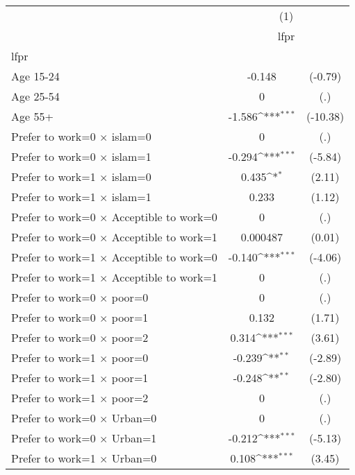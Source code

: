{
\def\sym#1{\ifmmode^{#1}\else\(^{#1}\)\fi}
\begin{longtable}{l*{1}{cc}}
\hline\hline\endfirsthead\hline\endhead\hline\endfoot\endlastfoot
                    &\multicolumn{2}{c}{(1)}           \\
                    &\multicolumn{2}{c}{lfpr}          \\
\hline
lfpr                &                     &            \\
Age 15-24           &      -0.148         &     (-0.79)\\
Age 25-54           &           0         &         (.)\\
Age 55+             &      -1.586\sym{***}&    (-10.38)\\
Prefer to work=0 $\times$ islam=0&           0         &         (.)\\
Prefer to work=0 $\times$ islam=1&      -0.294\sym{***}&     (-5.84)\\
Prefer to work=1 $\times$ islam=0&       0.435\sym{*}  &      (2.11)\\
Prefer to work=1 $\times$ islam=1&       0.233         &      (1.12)\\
Prefer to work=0 $\times$ Acceptible to work=0&           0         &         (.)\\
Prefer to work=0 $\times$ Acceptible to work=1&    0.000487         &      (0.01)\\
Prefer to work=1 $\times$ Acceptible to work=0&      -0.140\sym{***}&     (-4.06)\\
Prefer to work=1 $\times$ Acceptible to work=1&           0         &         (.)\\
Prefer to work=0 $\times$ poor=0&           0         &         (.)\\
Prefer to work=0 $\times$ poor=1&       0.132         &      (1.71)\\
Prefer to work=0 $\times$ poor=2&       0.314\sym{***}&      (3.61)\\
Prefer to work=1 $\times$ poor=0&      -0.239\sym{**} &     (-2.89)\\
Prefer to work=1 $\times$ poor=1&      -0.248\sym{**} &     (-2.80)\\
Prefer to work=1 $\times$ poor=2&           0         &         (.)\\
Prefer to work=0 $\times$ Urban=0&           0         &         (.)\\
Prefer to work=0 $\times$ Urban=1&      -0.212\sym{***}&     (-5.13)\\
Prefer to work=1 $\times$ Urban=0&       0.108\sym{***}&      (3.45)\\

\end{longtable}}
